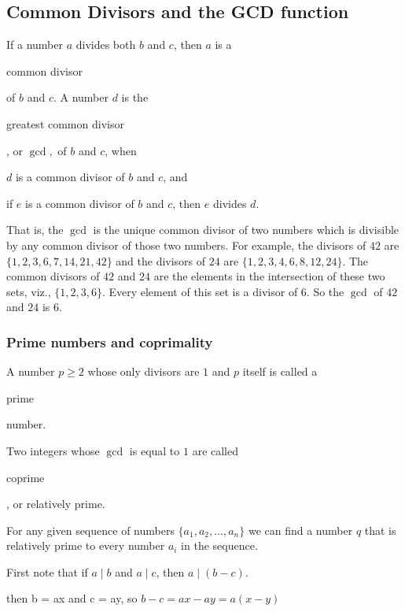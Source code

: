 \documentclass[11pt]{article}
\theoremstyle{plain}
\theoremstyle{definition}
\newenvironment{packed_items}{
\begin{itemize}
  \setlength{\itemsep}{1pt}
  \setlength{\parskip}{0pt}
  \setlength{\parsep}{0pt}
}{\end{itemize}}
\begin{document}
\subsection*{Common Divisors and the GCD function}

If a number $a$ divides both $b$ and $c$, then $a$ is a \begin{em}common divisor\end{em} of $b$ and $c$. A number $d$ is the \begin{em}greatest common divisor\end{em}, or $\gcd,$ of $b$ and $c$, when
  
\begin{packed_items}
  \item $d$ is a common divisor of $b$ and $c$, and
  \item if $e$ is a common divisor of $b$ and $c$, then $e$ divides $d.$
\end{packed_items}

That is, the $\gcd$ is the unique common divisor of two numbers which is divisible by any common divisor of those two numbers. For example, the divisors of $42$ are $\{ 1,2,3,6,7,14,21,42 \}$ and the divisors of $24$ are $\{ 1,2,3,4,6,8,12,24 \}$. The common divisors of $42$ and $24$ are the elements in the intersection of these two sets, viz., $\{ 1,2,3,6 \}$. Every element of this set is a divisor of $6$. So the $\gcd$ of $42$ and $24$ is $6.$

\subsubsection*{Prime numbers and coprimality}

A number $p \ge 2$ whose only divisors are $1$ and $p$ itself is called a \begin{em}prime\end{em} number.

Two integers whose $\gcd$ is equal to $1$ are called \begin{em}coprime\end{em}, or relatively prime.

For any given sequence of numbers $\{a_1, a_2, \dots, a_n\}$ we can find a number $q$ that is relatively prime to every number $a_i$ in the sequence.


First note that if $a \mid b$ and $a \mid c$, then $a \mid (b - c)$.

then b = ax and c = ay, so $b - c = ax - ay = a(x - y)$ 
\end{document}
